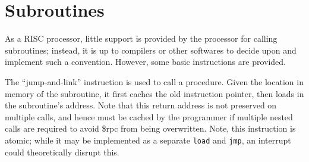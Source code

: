 \documentclass[10pt]{article}
\begin{document}
%
%
%
%
%
%
%
%

    \section{Subroutines}\label{sec:subroutines}

    As a RISC processor, little support is provided by the processor for calling subroutines;
    instead, it is up to compilers or other softwares to decide upon and implement such a convention.
    However, some basic instructions are provided.

    The  ``jump-and-link'' instruction is used to call a procedure.
    Given the location in memory of the subroutine, it first caches the old instruction pointer, then loads in the subroutine's address.
    Note that this return address is not preserved on multiple calls, and hence must be cached by the programmer if multiple nested calls are required to avoid \$rpc from being overwritten.
    Note, this instruction is atomic; while it may be implemented as a separate \texttt{load} and \texttt{jmp}, an interrupt could theoretically disrupt this.
\end{document}

